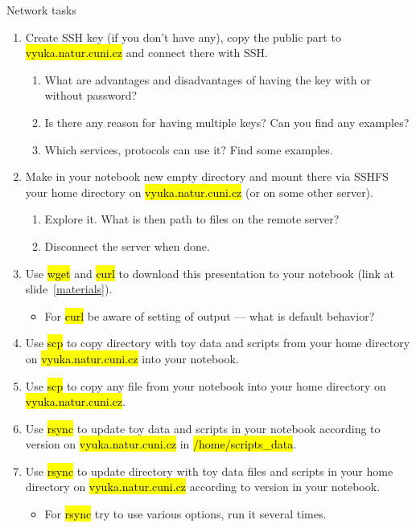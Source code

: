 \documentclass[compress, ucs, xelatex, 11pt, xcolor=svgnames, aspectratio=169,
	hyperref={
		bookmarks=true,
		unicode=true,
		colorlinks=true,
		pdftitle={Linux, command line and MetaCentrum},
		plainpages=false,
		pdfauthor={Vojtech Zeisek},
		pdfsubject={Course about use of Linux command line, writing shell scripts and using MetaCentrum of CESNET},
		pdfcreator={XeLaTeX},
		pdfkeywords={Linux, GNU, BASH, shell, command line, MetaCentrum},
		linkcolor=DarkRed, %
		anchorcolor=DarkBlue, %
		citecolor=Indigo, %
		filecolor=NavyBlue, %
		menucolor=DarkMagenta, %
		urlcolor=DarkBlue, %
		pdftex},
	url={hyphens, lowtilde} %
	]{beamer}
\renewcommand{\texttt}[1]{\hl{\ttfamily #1}}
\begin{document}
\begin{frame}[allowframebreaks]{Network tasks}
	\begin{enumerate}
		\item Create SSH key (if you don't have any), copy the public part to \texttt{vyuka.natur.cuni.cz} and connect there with SSH.
		\begin{enumerate}
			\item What are advantages and disadvantages of having the key with or without password?
			\item Is there any reason for having multiple keys? Can you find any examples?
			\item Which services, protocols can use it? Find some examples.
		\end{enumerate}
		\item Make in your notebook new empty directory and mount there via SSHFS your home directory on \texttt{vyuka.natur.cuni.cz} (or on some other server).
		\begin{enumerate}
			\item Explore it. What is then path to files on the remote server?
			\item Disconnect the server when done.
		\end{enumerate}
		\item Use \texttt{wget} and \texttt{curl} to download this presentation to your notebook (link at slide~\ref{materials}).
		\begin{itemize}
			\item For \texttt{curl} be aware of setting of output --- what is default behavior?
		\end{itemize}
		\item Use \texttt{scp} to copy directory with toy data and scripts from your home directory on \texttt{vyuka.natur.cuni.cz} into your notebook.
		\item Use \texttt{scp} to copy any file from your notebook into your home directory on \texttt{vyuka.natur.cuni.cz}.
		\item Use \texttt{rsync} to update toy data and scripts in your notebook according to version on \texttt{vyuka.natur.cuni.cz} in \texttt{/home/scripts\_data}.
		\item Use \texttt{rsync} to update directory with toy data files and scripts in your home directory on \texttt{vyuka.natur.cuni.cz} according to version in your notebook.
		\begin{itemize}
			\item For \texttt{rsync} try to use various options, run it several times.

\end{itemize}
\end{enumerate}
\end{frame}
\end{document}
